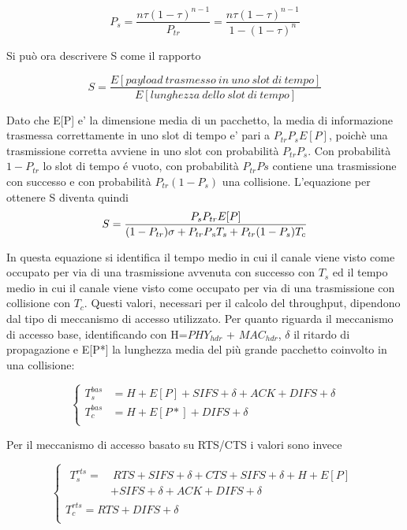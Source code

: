 \begin{equation}
P_{s} = \frac{n\tau(1-\tau)^{n-1}}{P_{tr}} = \frac{n\tau(1-\tau)^{n-1}}{ 1-(1-\tau)^n}
\end{equation} 

Si pu\`o ora descrivere S come il rapporto

\begin{equation}
S = \frac{E[payload \ trasmesso \ in \ uno \ slot \ di \ tempo]}{E[lunghezza \ dello \ slot \ di \ tempo]}
\end{equation}

Dato che E[P] e' la dimensione media di un pacchetto, la media di informazione trasmessa correttamente in uno slot di tempo e' pari a $P_{tr}P_{s}E[P]$, poich\`e una trasmissione corretta avviene in uno slot con probabilit\`a $P_{tr}P_{s}$.
Con probabilit\`a $1-P_{tr}$ lo slot di tempo \'e vuoto, con probabilit\`a $P_{tr}P{s}$ contiene una trasmissione con successo e con probabilit\`a $P_{tr}(1-P_{s})$ una collisione.
L'equazione per ottenere S diventa quindi
\begin{equation}
S = \frac{P_{s} P_{tr} E[P]}{	(1-P_{tr})\sigma + P_{tr} P\textsubscript{s} T_{s} + P_{tr}(1-P_{s})T_{c}}
\end{equation}

In questa equazione si identifica il tempo medio in cui il canale viene visto come occupato per via di una trasmissione avvenuta con successo con $T_{s}$ ed il tempo medio in cui il canale viene visto come occupato per via di una trasmissione con collisione con $T_{c}$.
Questi valori, necessari per il calcolo del throughput, dipendono dal tipo di meccanismo di accesso utilizzato.
Per quanto riguarda il meccanismo di accesso base, identificando con H=$ PHY_{hdr}$ + $MAC_{hdr}$, $\delta$ il ritardo di propagazione e E[P*] la lunghezza media del pi\`u grande pacchetto coinvolto in una collisione:

$$
\begin{cases}
T_{s}^{bas} &= H + E[P] + SIFS + \delta + ACK + DIFS + \delta \\
T_{c}^{bas} &= H + E[P*] + DIFS + \delta \\
\end{cases}
$$

Per il meccanismo di accesso basato su RTS/CTS i valori sono invece

$$
\begin{cases}
\!\begin{aligned}
T_{s}^{rts} =  &\ RTS + SIFS + \delta + CTS + SIFS + \delta + H + E[P]  \\ & + SIFS + \delta + ACK + DIFS + \delta 
\end{aligned}
\\
T_{c}^{rts} = RTS + DIFS + \delta \\
\end{cases}
$$

